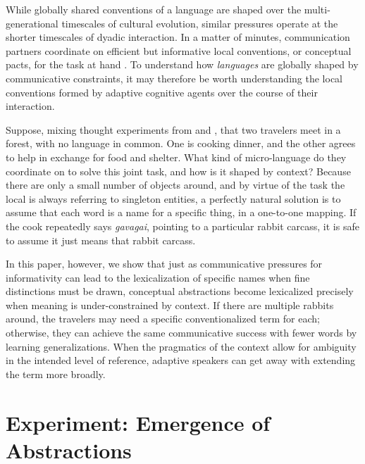 \documentclass[10pt,letterpaper]{article}
\begin{document}
While globally shared conventions of a language are shaped over the multi-generational timescales of cultural evolution, similar pressures operate at the shorter timescales of dyadic interaction. In a matter of minutes, communication partners coordinate on efficient but informative local conventions, or conceptual pacts, for the task at hand \cite{ClarkWilkesGibbs86_ReferringCollaborative, BrennanClark96_ConceptualPactsConversation,HawkinsFrankGoodman17_ConventionFormation}. To understand how \emph{languages} are globally shaped by communicative constraints, it may therefore be worth understanding the local conventions formed by adaptive cognitive agents over the course of their interaction.

Suppose, mixing thought experiments from  and , that two travelers meet in a forest, with no language in common. One is cooking dinner, and the other agrees to help in exchange for food and shelter. What kind of micro-language do they coordinate on to solve this joint task, and how is it shaped by context? 
Because there are only a small number of objects around, and by virtue of the task the local is always referring to singleton entities, a perfectly natural solution is to assume that each word is a name for a specific thing, in a one-to-one mapping. If the cook repeatedly says \emph{gavagai}, pointing to a particular rabbit carcass, it is safe to assume it just means that rabbit carcass. 

In this paper, however, we show that just as communicative pressures for informativity can lead to the lexicalization of specific names when fine distinctions must be drawn, conceptual abstractions become lexicalized precisely when meaning is under-constrained by context. If there are multiple rabbits around, the travelers may need a specific conventionalized term for each; otherwise, they can achieve the same communicative success with fewer words by learning generalizations. When the pragmatics of the context allow for ambiguity in the intended level of reference, adaptive speakers can get away with extending the term more broadly. 
			
\section{Experiment: Emergence of Abstractions}
\end{document}
